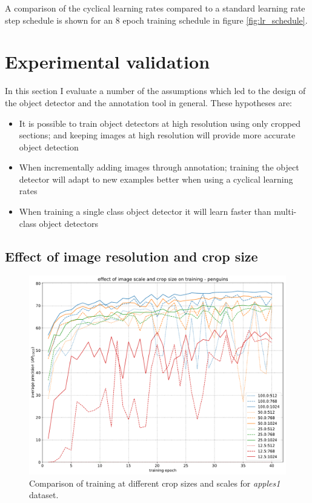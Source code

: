 A comparison of the cyclical learning rates compared to a standard learning rate step schedule is shown for an $8$ epoch training schedule in figure \ref{fig:lr_schedule}.

\section {Experimental validation}

In this section I evaluate a number of the assumptions which led to the design of the object detector and the annotation tool in general. These hypotheses are:

\begin{itemize}
    \item {It is possible to train object detectors at high resolution using only cropped sections; and keeping images at high resolution will provide more accurate object detection}
    \item {When incrementally adding images through annotation; training the object detector will adapt to new examples better when using a cyclical learning rates}    
    \item {When training a single class object detector it will learn faster than multi-class object detectors}
\end{itemize} 


\subsection {Effect of image resolution and crop size}
\label{sec:scale_crop}


\begin{figure}[h]
  \centering
  \includegraphics[width=1.0\linewidth]{charts/training/crops_scales/penguins.pdf}
  \caption{Comparison of training at different crop sizes and scales for \emph{apples1} dataset. }  
  \label{fig:apples_crop_scale}
\end{figure}

